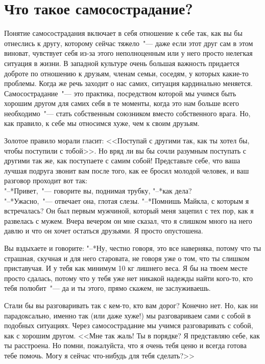 
\chapter{Что такое самосострадание?} \label{What_is_self-compassion}

Понятие самосострадания включает в себя отношение к себе так, как вы бы отнеслись к другу, которому сейчас тяжело~"--- даже если этот друг сам в этом виноват,  чувствует себя из-за этого неполноценным или у него просто нелегкая ситуация в жизни. В западной культуре очень большая важность придается доброте по отношению к друзьям, членам семьи, соседям, у которых какие-то проблемы. Когда же речь заходит о нас самих, ситуация кардинально меняется. Самосострадание~"--- это практика, посредством которой мы учимся быть хорошим другом для самих себя в те моменты, когда это нам больше всего необходимо~"--- стать собственным союзником вместо собственного врага. Но, как правило, к себе мы относимся хуже, чем к своим друзьям.

Золотое правило морали гласит: <<Поступай с другими так, как ты хотел бы, чтобы поступили с тобой>>. Но вряд ли вы бы сочли разумным поступать с другими так же, как поступаете с самим собой! Представьте себе, что ваша лучшая подруга звонит вам после того, как ее бросил молодой человек, и ваш разговор проходит вот так:\\
"--*Привет,~"--- говорите вы, поднимая трубку, "--*как дела?\\
"--*Ужасно,~"--- отвечает она, глотая слезы. "--*Помнишь Майкла, с которым я встречалась? Он был первым мужчиной, который меня зацепил с тех пор, как я развелась с мужем. Вчера вечером он мне сказал, что я слишком много на него давлю и что он хочет остаться друзьями. Я просто опустошена.

Вы вздыхаете и говорите:
"--*Ну, честно говоря, это все наверняка, потому что ты страшная, скучная и для него старовата, не говоря уже о том, что ты слишком приставучая. И у тебя как минимум 10 кг лишнего веса. Я бы на твоем месте просто сдалась, потому что у тебя уже нет никакой надежды найти кого-то, кто тебя полюбит~"--- да и ты этого, прямо скажем, не заслуживаешь.

Стали бы вы разговаривать так с кем-то, кто вам дорог? Конечно нет. Но, как ни парадоксально, именно так (или даже хуже!) мы разговариваем сами с собой в подобных ситуациях. Через самосострадание мы учимся разговаривать с собой, как с хорошим другом. <<Мне так жаль! Ты в порядке? Я представляю себе, как ты расстроена. Но помни, пожалуйста, что я очень тебя ценю и всегда готова тебе помочь. Могу я сейчас что-нибудь для тебя сделать?>>

